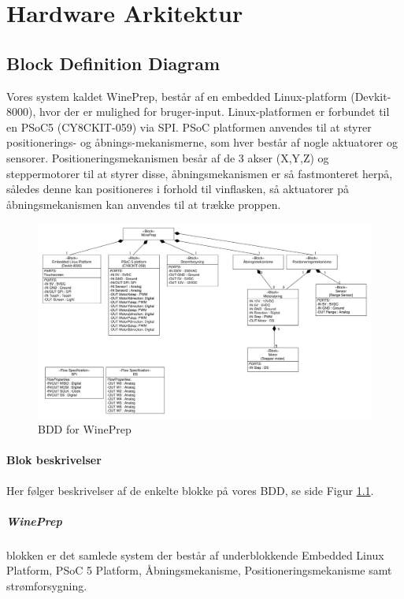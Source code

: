 \chapter{Hardware Arkitektur}

\section{Block Definition Diagram}
Vores system kaldet WinePrep, består af en embedded Linux-platform (Devkit-8000), hvor der er mulighed for bruger-input. Linux-platformen er forbundet til en PSoC5 (CY8CKIT-059) via SPI. PSoC platformen anvendes til at styrer positionerings- og åbnings-mekanismerne, som hver består af nogle aktuatorer og sensorer. Positioneringsmekanismen besår af de 3 akser (X,Y,Z) og steppermotorer til at styrer disse, åbningsmekanismen er så fastmonteret herpå, således denne kan positioneres i forhold til vinflasken, så aktuatorer på åbningsmekanismen kan anvendes til at trække proppen.

\begin{figure}[H]
	\centering
	\includegraphics[scale=0.3]{blockdefinitiondiagram}
	\caption{BDD for WinePrep}
	\label{BDD}
\end{figure}

\subsubsection{Blok beskrivelser}
Her følger beskrivelser af de enkelte blokke på vores BDD, se side \pageref{BDD} Figur \ref{BDD}.

\paragraph{WinePrep} blokken er det samlede system der består af underblokkende Embedded Linux Platform, PSoC 5 Platform, Åbningsmekanisme, Positioneringsmekanisme samt strømforsygning.

